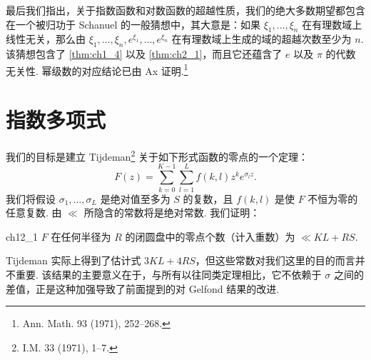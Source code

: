 最后我们指出，关于指数函数和对数函数的超越性质，我们的绝大多数期望都包含在一个被归功于 Schanuel 的一般猜想中，其大意是：如果 $\xi_1, \ldots, \xi_n$ 在有理数域上线性无关，那么由 $\xi_1, \ldots, \xi_n, e^{\xi_1}, \ldots, e^{\xi_n}$ 在有理数域上生成的域的超越次数至少为 $n$. 该猜想包含了 \autoref{thm:ch1_4} 以及 \autoref{thm:ch2_1}，而且它还蕴含了 $e$ 以及 $\pi$ 的代数无关性. 幂级数的对应结论已由 Ax 证明.\footnote{Ann. Math. 93 (1971), 252--268.}

\section{指数多项式}

我们的目标是建立 Tijdeman\footnote{I.M. 33 (1971), 1--7.} 关于如下形式函数的零点的一个定理：
\[F(z) = \sum_{k=0}^{K-1} \sum_{l=1}^{L} f(k,l) z^{k} e^{\sigma_{l} z}.\]
我们将假设 $\sigma_1, \ldots, \sigma_L$ 是绝对值至多为 $S$ 的复数，且 $f(k,l)$ 是使 $F$ 不恒为零的任意复数. 由 $\ll$ 所隐含的常数将是绝对常数. 我们证明：

\begin{mylemma}{}{ch12_1}
$F$ 在任何半径为 $R$ 的闭圆盘中的零点个数（计入重数）为 $\ll KL + RS$.
\end{mylemma}

Tijdeman 实际上得到了估计式 $3KL + 4RS$，但这些常数对我们这里的目的而言并不重要. 该结果的主要意义在于，与所有以往同类定理相比，它不依赖于 $\sigma$ 之间的差值，正是这种加强导致了前面提到的对 Gelfond 结果的改进.

